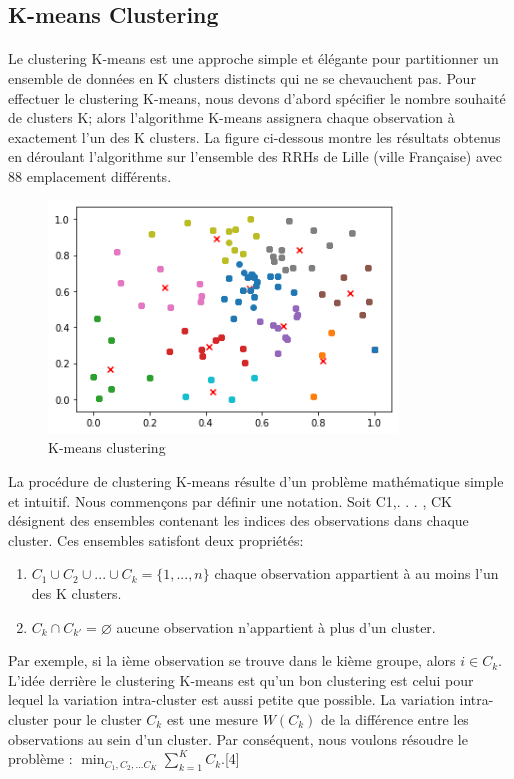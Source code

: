 \documentclass{report}
\begin{document}
\subsection{K-means Clustering} 
\paragraph{}
Le clustering K-means est une approche simple et élégante pour partitionner un ensemble de données en K clusters distincts qui ne se chevauchent pas. Pour effectuer le clustering K-means, nous devons d'abord spécifier le nombre souhaité de clusters K; alors l'algorithme K-means assignera chaque observation à exactement l'un des K clusters. 
La figure ci-dessous montre les résultats obtenus en déroulant l'algorithme sur l'ensemble des RRHs de Lille (ville Française) avec 88 emplacement différents.

\begin{figure}[h]
  \centering
  \includegraphics[width=25em]{images/k-means_lille.png}
  \caption{K-means clustering}
\end{figure}

La procédure de clustering K-means résulte d'un problème mathématique simple et intuitif. Nous commençons par définir une notation. Soit C1,. . . , CK désignent des ensembles contenant les indices des observations dans chaque cluster. Ces ensembles satisfont deux propriétés:
\begin{enumerate}
\item $C_{1} \cup C_{2} \cup ... \cup C_{k}=\lbrace1,...,n\rbrace$ chaque observation appartient à au moins l'un des K clusters.
\item $C_{k} \cap C_{k'}= \varnothing $ aucune observation n'appartient à plus d'un cluster.
\end{enumerate}
Par exemple, si la ième observation se trouve dans le kième groupe, alors $i \in C_{k}$. L'idée derrière le clustering K-means est qu'un bon clustering est celui pour lequel la variation intra-cluster est aussi petite que possible. La variation intra-cluster pour le cluster $C_{k}$ est une mesure $W(C_{k})$ de la différence entre les observations au sein d'un cluster. Par conséquent, nous voulons résoudre le problème :
$\min_{C_{1}, C_{2}, ... C_{K}}\sum^K_{k=1}C_{k}$.[4]
\end{document}
